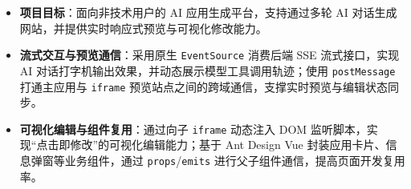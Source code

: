 \documentclass[10pt]{article}
\begin{document}

    \vspace{0.18em}

    \begin{itemize}
        \item \textbf{项目目标}：面向非技术用户的 AI 应用生成平台，支持通过多轮 AI 对话生成网站，并提供实时响应式预览与可视化修改能力。
        \item \textbf{流式交互与预览通信}：采用原生 \texttt{EventSource} 消费后端 SSE 流式接口，实现 AI 对话打字机输出效果，并动态展示模型工具调用轨迹；使用 \texttt{postMessage} 打通主应用与 \texttt{iframe} 预览站点之间的跨域通信，支撑实时预览与编辑状态同步。
        \item \textbf{可视化编辑与组件复用}：通过向子 \texttt{iframe} 动态注入 DOM 监听脚本，实现“点击即修改”的可视化编辑能力；基于 Ant Design Vue 封装应用卡片、信息弹窗等业务组件，通过 \texttt{props}/\texttt{emits} 进行父子组件通信，提高页面开发复用率。
    \end{itemize}

\end{document}
